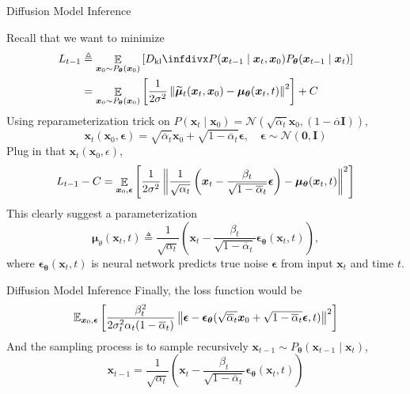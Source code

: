 \documentclass[10pt,xcolor={usenames,dvipsnames,table},aspectratio=169]{beamer}
\begin{document}
\begin{frame}{Diffusion Model Inference}

    Recall that we want to minimize
    \begin{align*}
    L_{t-1} 
    &\triangleq \mathop{\mathbb{E}}_{\bm{x}_0 \sim P_{\boldsymbol \theta}(\bm{x}_0)} \left[\Dkl{P(\bm{x}_{t-1} \mid \bm{x}_t, \bm{x}_0)}{P_{\boldsymbol \theta}(\bm{x}_{t-1} \mid \bm{x}_t)} \right] \\
    &= \mathop{\mathbb{E}}_{\bm{x}_0 \sim P_{\boldsymbol \theta}(\bm{x}_0)} \left[ \dfrac{1}{2\sigma^2} \norm{\widetilde{\boldsymbol \mu}_t(\bm{x}_t, \bm{x}_0) - \boldsymbol \mu_{\boldsymbol \theta}(\bm{x}_t, t)}^2  \right] + C
    \end{align*} 
    Using reparameterization trick on $P(\bm{x}_t \mid \bm{x}_0) = \mathcal{N}(\sqrt{\overline{\alpha}_t} \bm{x}_0, (1-\overline{\alpha} \bm{I}))$,
    \[
    \bm{x}_t(\bm{x}_0, \boldsymbol \epsilon) = \sqrt{\overline{\alpha}_t} \bm{x}_0 + \sqrt{1- \overline{\alpha}_t} \boldsymbol \epsilon, \quad \boldsymbol \epsilon \sim \mathcal{N}(\bm{0}, \bm{I})
    \] 
    Plug in that $\bm{x}_t(\bm{x}_0, \epsilon)$,
    \[
    L_{t-1} - C = \mathop{\mathbb{E}}_{\bm{x}_0, \boldsymbol \epsilon} \left[ \dfrac{1}{2\sigma^2 }\left\lVert\dfrac{1}{\sqrt{\alpha_t}} \left( \bm{x}_t - \dfrac{\beta_t}{\sqrt{1-\overline{\alpha}_t}} \boldsymbol \epsilon \right) - \boldsymbol \mu_{\boldsymbol \theta}(\bm{x}_t, t)\right\rVert^2 \right]
    \] 
    This clearly suggest a parameterization 
    \[
    \boldsymbol \mu_{\theta}(\bm{x}_t, t) \triangleq \dfrac{1}{\sqrt{\alpha_t}} \left( \bm{x}_t - \dfrac{\beta_t}{\sqrt{1-\overline{\alpha}_t}} \boldsymbol\epsilon_{\boldsymbol \theta}(\bm{x}_t, t) \right),
\]
where $\boldsymbol \epsilon_{\boldsymbol \theta}(\bm{x}_t, t)$ is neural network predicts true noise $\boldsymbol \epsilon$ from input $\bm{x}_t$ and time $t$.
\end{frame}
\begin{frame}{Diffusion Model Inference}
    Finally, the loss function would be
    \[
    \mathbb{E}_{\bm{x}_0, \boldsymbol \epsilon} \left[ \dfrac{\beta_t^2}{2\sigma^2_t \alpha_t(1- \overline{\alpha}_t)} \left\lVert\boldsymbol \epsilon - \boldsymbol \epsilon_{\boldsymbol \theta}(\sqrt{\overline{\alpha}_t} \bm{x}_0 + \sqrt{1-\overline{\alpha}_t} \boldsymbol \epsilon, t)\right\rVert^2 \right]
    \] 
    And the sampling process is to sample recursively $\bm{x}_{t-1} \sim P_{\boldsymbol \theta}(\bm{x}_{t-1} \mid \bm{x}_t)$,
    \[
    \bm{x}_{t-1} = \dfrac{1}{\sqrt{\alpha_t}} \left( \bm{x}_t - \dfrac{\beta_t}{\sqrt{1- \overline{\alpha}_t}} \boldsymbol \epsilon_{\boldsymbol \theta}(\bm{x}_t, t) \right)
    \] 

\end{frame}
\end{document}
